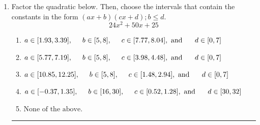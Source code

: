 \documentclass[14pt]{extbook}
\newcommand{\litem}[1]{\item#1\hspace*{-1cm}\rule{\textwidth}{0.4pt}}
\begin{document}
\begin{enumerate}
{\begin{enumerate}[label=\Alph*.]
\end{enumerate} }
\litem{
Factor the quadratic below. Then, choose the intervals that contain the constants in the form $(ax+b)(cx+d); b \leq d.$\[ 24x^{2} +50 x + 25 \]\begin{enumerate}[label=\Alph*.]
\item \( a \in [1.93, 3.39], \hspace*{5mm} b \in [5, 8], \hspace*{5mm} c \in [7.77, 8.04], \text{ and } \hspace*{5mm} d \in [0, 7] \)
\item \( a \in [5.77, 7.19], \hspace*{5mm} b \in [5, 8], \hspace*{5mm} c \in [3.98, 4.48], \text{ and } \hspace*{5mm} d \in [0, 7] \)
\item \( a \in [10.85, 12.25], \hspace*{5mm} b \in [5, 8], \hspace*{5mm} c \in [1.48, 2.94], \text{ and } \hspace*{5mm} d \in [0, 7] \)
\item \( a \in [-0.37, 1.35], \hspace*{5mm} b \in [16, 30], \hspace*{5mm} c \in [0.52, 1.28], \text{ and } \hspace*{5mm} d \in [30, 32] \)
\item \( \text{None of the above.} \)


\end{enumerate}}
\end{enumerate}
\end{document}
